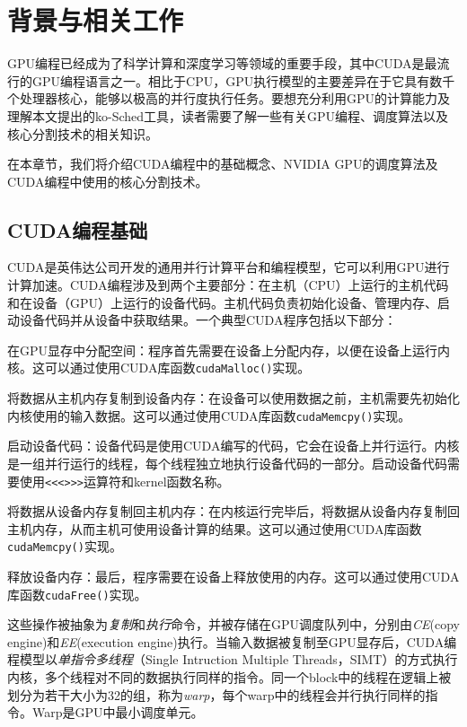 \chapter{背景与相关工作}\label{background}

GPU编程已经成为了科学计算和深度学习等领域的重要手段，其中CUDA是最流行的GPU编程语言之一。相比于CPU，GPU执行模型的主要差异在于它具有数千个处理器核心，能够以极高的并行度执行任务。要想充分利用GPU的计算能力及理解本文提出的ko-Sched工具，读者需要了解一些有关GPU编程、调度算法以及核心分割技术的相关知识。

在本章节，我们将介绍CUDA编程中的基础概念、NVIDIA GPU的调度算法及CUDA编程中使用的核心分割技术。

\section{CUDA编程基础}

CUDA是英伟达公司开发的通用并行计算平台和编程模型，它可以利用GPU进行计算加速。CUDA编程涉及到两个主要部分：在主机（CPU）上运行的主机代码和在设备（GPU）上运行的设备代码。主机代码负责初始化设备、管理内存、启动设备代码并从设备中获取结果。一个典型CUDA程序包括以下部分：
\begin{enumerate*}[label=\roman*),itemjoin={\quad}]
    \item 在GPU显存中分配空间：程序首先需要在设备上分配内存，以便在设备上运行内核。这可以通过使用CUDA库函数\texttt{cudaMalloc()}实现。
    \item 将数据从主机内存复制到设备内存：在设备可以使用数据之前，主机需要先初始化内核使用的输入数据。这可以通过使用CUDA库函数\texttt{cudaMemcpy()}实现。
    \item 启动设备代码：设备代码是使用CUDA编写的代码，它会在设备上并行运行。内核是一组并行运行的线程，每个线程独立地执行设备代码的一部分。启动设备代码需要使用\texttt{<<<>>>}运算符和kernel函数名称。
    \item 将数据从设备内存复制回主机内存：在内核运行完毕后，将数据从设备内存复制回主机内存，从而主机可使用设备计算的结果。这可以通过使用CUDA库函数\texttt{cudaMemcpy()}实现。
    \item 释放设备内存：最后，程序需要在设备上释放使用的内存。这可以通过使用CUDA库函数\texttt{cudaFree()}实现。
\end{enumerate*}

这些操作被抽象为\emph{复制}和\emph{执行}命令，并被存储在GPU调度队列中，分别由\emph{CE}(copy engine)和\emph{EE}(execution engine)执行。当输入数据被复制至GPU显存后，CUDA编程模型以\emph{单指令多线程}（Single Intruction Multiple Threads，SIMT）的方式执行内核，多个线程对不同的数据执行同样的指令。同一个block中的线程在逻辑上被划分为若干大小为32的组，称为\emph{warp}，每个warp中的线程会并行执行同样的指令。Warp是GPU中最小调度单元。

